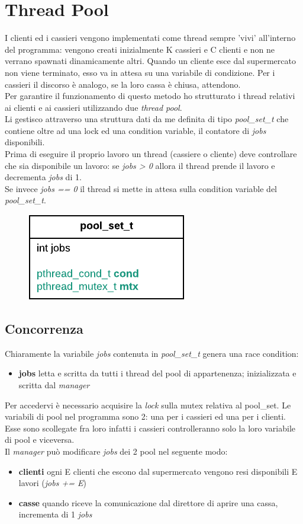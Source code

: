 \documentclass[11pt, a4paper]{article}
\begin{document}
\section{Thread Pool}
I clienti ed i cassieri vengono implementati come thread sempre 'vivi' all'interno del programma: vengono creati inizialmente K cassieri e C clienti e non ne verrano spawnati dinamicamente altri. Quando un cliente esce dal supermercato non viene terminato, esso va in attesa su una variabile di condizione. Per i cassieri il discorso è analogo, se la loro cassa è chiusa, attendono.\\
Per garantire il funzionamento di questo metodo ho strutturato i thread relativi ai clienti e ai cassieri utilizzando due \textit{thread pool}. \\Li gestisco attraverso una struttura dati da me definita di tipo \textit{pool\_set\_t} che contiene oltre ad una lock ed una condition variable, il contatore di \textit{jobs} disponibili.\\
Prima di eseguire il proprio lavoro un thread (cassiere o cliente) deve controllare che sia disponibile un lavoro: se \textit{jobs > 0} allora il thread prende il lavoro e decrementa \textit{jobs} di 1. \\ Se invece \textit{jobs == 0} il thread si mette in attesa sulla condition variable del \textit{pool\_set\_t}.
\begin{figure}[h]
	\centering
	\includegraphics[scale=1]{pool_res.png}
	\label{fig:0}
\end{figure}
\subsection{Concorrenza}
Chiaramente la variabile \textit{jobs} contenuta in \textit{pool\_set\_t} genera una race condition:
\begin{itemize}
\item \textbf{jobs}	letta e scritta da tutti i thread del pool di appartenenza; inizializzata e scritta dal \textit{manager}
\end{itemize} 
Per accedervi è necessario acquisire la \textit{lock} sulla mutex relativa al pool\_set. 
Le variabili di pool nel programma sono 2: una per i cassieri ed una per i clienti. Esse sono scollegate fra loro infatti i cassieri controlleranno solo la loro variabile di pool e viceversa.\\
Il \textit{manager} può modificare \textit{jobs} dei 2 pool nel seguente modo:
\begin{itemize}
\item \textbf{clienti}	ogni E clienti che escono dal supermercato vengono resi disponibili E lavori (\textit{jobs += E})
\item \textbf{casse}	quando riceve la comunicazione dal direttore di aprire una cassa, incrementa di 1 \textit{jobs}
\end{itemize}
\end{document}
